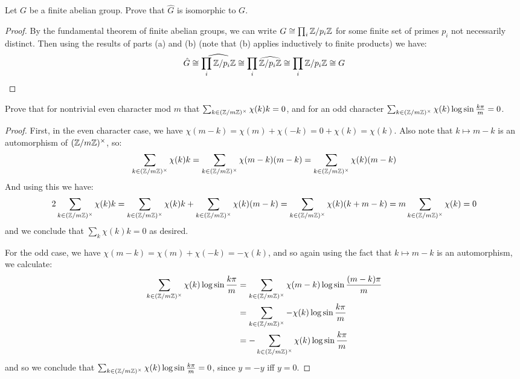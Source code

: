\documentclass[11pt]{article}
\begin{document}
Let $G$ be a finite abelian group. Prove that $\hat G$ is isomorphic to $G$.
\begin{proof}
  By the fundamental theorem of finite abelian groups, we can write $G \cong \prod_i \mathbb{Z}/p_i\mathbb{Z}$ for some finite set of primes $p_i$ not necessarily distinct.
  Then using the results of parts (a) and (b) (note that (b) applies inductively to finite products) we have:
  \begin{equation*}
    \hat{G}
    \cong \widehat{\prod_i \mathbb{Z}/p_i\mathbb{Z}}
    \cong \prod_i \widehat{\mathbb{Z}/p_i\mathbb{Z}}
    \cong \prod_i \mathbb{Z}/p_i\mathbb{Z} \cong G
  \end{equation*}
\end{proof}


Prove that for nontrivial even character mod $m$ that $\sum_{k \in (\mathbb{Z}/m\mathbb{Z})^\times} \chi(k) k = 0$, and for an odd character $\sum_{k \in (\mathbb{Z}/m\mathbb{Z})^\times} \chi(k) \log \sin \frac{k\pi}{m} = 0$.
\begin{proof}
  First, in the even character case, we have $\chi(m-k) = \chi(m) + \chi(-k) = 0 + \chi(k) = \chi(k)$.
  Also note that $k \mapsto m - k$ is an automorphism of $(\mathbb{Z}/m\mathbb{Z})^\times$, so:
  \begin{equation*}
    \sum_{k \in (\mathbb{Z}/m\mathbb{Z})^\times} \chi(k) k = \sum_{k \in (\mathbb{Z}/m\mathbb{Z})^\times} \chi(m - k)(m-k) = \sum_{k \in (\mathbb{Z}/m\mathbb{Z})^\times} \chi(k)(m-k)
  \end{equation*}
  And using this we have:
  \begin{equation*}
    2\sum_{k \in (\mathbb{Z}/m\mathbb{Z})^\times} \chi(k) k
    = \sum_{k \in (\mathbb{Z}/m\mathbb{Z})^\times} \chi(k) k + \sum_{k \in (\mathbb{Z}/m\mathbb{Z})^\times} \chi(k) (m-k)
    = \sum_{k \in (\mathbb{Z}/m\mathbb{Z})^\times} \chi(k) (k + m - k)
    = m\sum_{k \in (\mathbb{Z}/m\mathbb{Z})^\times} \chi(k)
    = 0
  \end{equation*}
  and we conclude that $\sum_k \chi(k) k = 0$ as desired.

  For the odd case, we have $\chi(m - k) = \chi(m) + \chi(-k) = -\chi(k)$, and so again using the fact that $k \mapsto m - k$ is an automorphism, we calculate:
  \begin{align*}
    \sum_{k \in (\mathbb{Z}/m\mathbb{Z})^\times} \chi(k) \log \sin \frac{k\pi}{m} 
    &= \sum_{k \in (\mathbb{Z}/m\mathbb{Z})^\times} \chi(m-k) \log \sin \frac{(m-k)\pi}{m} \\
    &= \sum_{k \in (\mathbb{Z}/m\mathbb{Z})^\times} -\chi(k) \log \sin \frac{k\pi}{m} \\
    &= - \sum_{k \in (\mathbb{Z}/m\mathbb{Z})^\times} \chi(k) \log \sin \frac{k\pi}{m} 
  \end{align*}
  and so we conclude that $\sum_{k \in (\mathbb{Z}/m\mathbb{Z})^\times} \chi(k) \log \sin \frac{k\pi}{m} = 0$, since $y = -y$ iff $y = 0$.
\end{proof}
\end{document}
